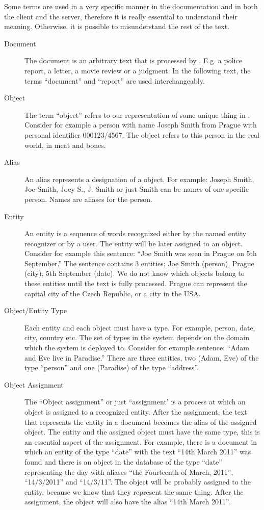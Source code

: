 Some terms are used in a very specific manner in the documentation and in both
the client and the server, therefore it is really essential to understand their
meaning. Otherwise, it is possible to misunderstand the rest of the text.

\begin{description}
\item[Document]
The document is an arbitrary text that is processed by \textan{}. E.g. a police
report, a letter, a movie review or a judgment. In the following text, the terms
``document'' and ``report'' are used interchangeably.

\item[Object]
The term ``object'' refers to our representation of some unique thing in
\textan{}. Consider for example a person with name Joseph Smith from Prague with
personal identifier 000123/4567. The object refers to this person in the real
world, in meat and bones.

\item[Alias]
An alias represents a designation of a object. For example: Joseph Smith, Joe
Smith, Joey S., J. Smith or just Smith can be names of one specific person.
Names are aliases for the person.

\item[Entity]
An entity is a sequence of words recognized either by the named entity
recognizer or by a user. The entity will be later assigned to an object.
Consider for example this sentence: ``Joe Smith was seen in Prague on 5th
September.'' The sentence contains 3 entities: Joe Smith (person), Prague
(city), 5th September (date). We do not know which objects belong to these
entities until the text is fully processed. Prague can represent the capital
city of the Czech Republic, or a city in the USA.

\item[Object/Entity Type]
Each entity and each object must have a type. For example, person, date, city,
country etc. The set of types in the system depends on the domain which the
system is deployed to. Consider for example sentence: ``Adam and Eve live in
Paradise.'' There are three entities, two (Adam, Eve) of the type ``person'' and
one (Paradise) of the type ``address''.

\item[Object Assignment]
The ``Object assignment'' or just ``assignment' is a process at which an object
is assigned to a recognized entity.  After the assignment, the text that
represents the entity in a document becomes the alias of the assigned object.
The entity and the assigned object must have the same type, this is an essential
aspect of the assignment. For example, there is a document in which an entity of
the type ``date'' with the text ``14th March 2011'' was found and there is an
object in the database of the type ``date'' representing the day with aliases
``the Fourteenth of March, 2011'', ``14/3/2011'' and ``14/3/11''. The object
will be probably assigned to the entity, because we know that they represent the
same thing. After the assignment, the object will also have the alias ``14th
March 2011''.


\end{description}
